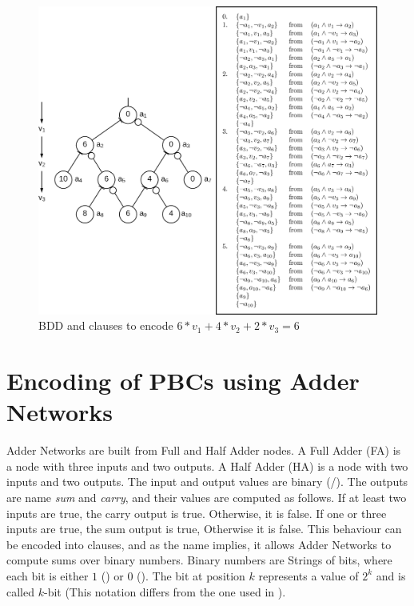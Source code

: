 \begin{figure}
\centering
\includegraphics[width=\textwidth]{Figures/BDDExampleComposition3.png}
\caption{BDD and clauses to encode $6*v_1+4*v_2+2*v_3=6$}
\label{fig:BDDExample}
\end{figure}


\section{Encoding of PBCs using Adder Networks}\label{PBCEncodingAdderNetworks}
Adder Networks are built from Full and Half Adder nodes. A Full Adder (FA) is a node with three inputs and two outputs. A Half Adder (HA) is a node with two inputs and two outputs. The input and output values are binary (\true{}/\false{}). The outputs are name \emph{sum} and \emph{carry}, and their values are computed as follows. If at least two inputs are true, the carry output is true. Otherwise, it is false. If one or three inputs are true, the sum output is true, Otherwise it is false. This behaviour can be encoded into clauses, and as the name implies, it allows Adder Networks to compute sums over binary numbers. Binary numbers are Strings of bits, where each bit is either $1$ (\true) or $0$ (\false). The bit at position $k$ represents a value of $2^k$ and is called $k$-bit (This notation differs from the one used in \cite{Een2006TranslatingPC}). \\

